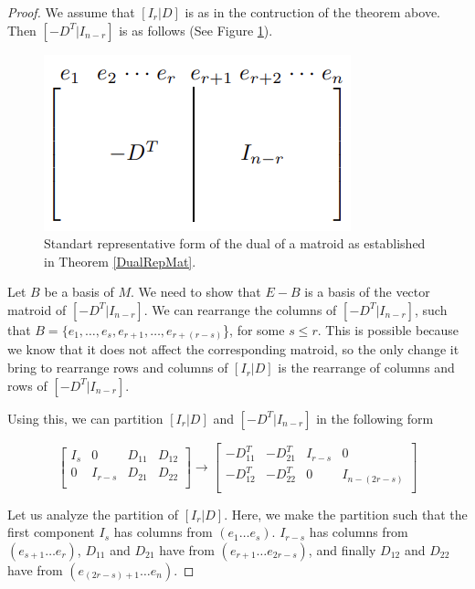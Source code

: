 \begin{proof}
    We assume that $[I_r|D]$ is as in the contruction of the theorem above. Then $[-D^T|I_{n-r}]$ is as follows (See Figure \ref{MatRepresentationDual}).
    \begin{figure}[h]
        \centering
        \includegraphics{VMRDual.png}
        \caption{Standart representative form of the dual of a matroid as established in Theorem \ref{DualRepMat}. \cite{oxley1}} 
        \label{MatRepresentationDual}
    \end{figure}

    Let $B$ be a basis of $M$. We need to show that $E-B$ is a basis of the vector matroid of $[-D^T|I_{n-r}]$. We can rearrange the columns of $[-D^T|I_{n-r}]$, such that $B=\{e_1,\dots,e_s, e_{r+1}, \dots, e_{r+(r-s)}$\}, for some $s \leq r$. This is possible because we know that it does not affect the corresponding matroid, so the only change it bring to rearrange rows and columns of $[I_r|D]$ is the rearrange of columns and rows of $[-D^T|I_{n-r}]$. 
    
    Using this, we can partition $[I_r|D]$ and $[-D^T|I_{n-r}]$ in the following form
    \begin{figure}[H]
    $$\begin{bmatrix}
    I_s & 0 & D_{11} & D_{12}\\
    0 & I_{r-s} & D_{21} & D_{22}\\
    \end{bmatrix}
    \rightarrow
    \begin{bmatrix}
    -D_{11}^T & -D_{21}^T & I_{r-s} & 0\\
    -D_{12}^T & -D_{22}^T & 0 & I_{n-(2r-s)}\\
    \end{bmatrix}$$
    \end{figure}
    Let us analyze the partition of $[I_r|D]$.
    Here, we make the partition such that the first component $I_s$ has columns from $(e_1 \dots e_s)$. $I_{r-s}$ has columns from $(e_{s+1} \dots e_r)$, $D_11$ and $D_21$ have from $(e_{r+1} \dots e_{2r-s})$, and finally $D_{12}$ and $D_{22}$ have from $(e_{(2r-s)+1} \dots e_n)$.
    

\end{proof}
